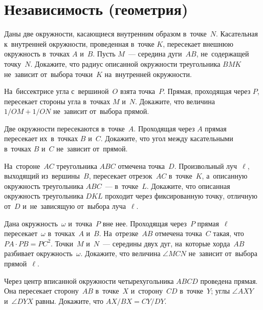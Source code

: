 
\section*{Независимость (геометрия)}


\begin{problems}

\item
Даны две окружности, касающиеся внутренним образом в~точке~$N$.
Касательная к~внутренней окружности, проведенная в~точке $K$, пересекает
внешнюю окружность в~точках $A$ и~$B$.
Пусть $M$~— середина дуги~$AB$, не~содержащей точку~$N$.
Докажите, что радиус описанной окружности треугольника $BMK$ не~зависит
от~выбора точки~$K$ на~внутренней окружности.

\item
На~биссектрисе угла с~вершиной~$O$ взята точка~$P$.
Прямая, проходящая через $P$, пересекает стороны угла в~точках $M$ и~$N$.
Докажите, что величина $1 / OM + 1 / ON$ не~зависит от~выбора прямой.

\item
Две окружности пересекаются в~точке~$A$.
Проходящая через $A$ прямая пересекает их~в~точках $B$ и~$C$.
Докажите, что угол между касательными в~точках $B$ и~$C$ не~зависит от~прямой.

\item
На~стороне~$AC$ треугольника $ABC$ отмечена точка~$D$.
Произвольный луч~$\ell$, выходящий из~вершины~$B$, пересекает отрезок~$AC$
в~точке~$K$, а~описанную окружность треугольника $ABC$~— в~точке~$L$.
Докажите, что описанная окружность треугольника $DKL$ проходит через
фиксированную точку, отличную от~$D$ и~не~зависящую от~выбора луча~$\ell$.

\item
Дана окружность~$\omega$ и~точка~$P$ вне нее.
Проходящая через~$P$ прямая~$\ell$ пересекает~$\omega$ в~точках~$A$ и~$B$.
На~отрезке~$AB$ отмечена точка~$C$ такая, что~$PA\cdot PB=PC^2$.
Точки~$M$ и~$N$~— середины двух дуг, на~которые хорда~$AB$ разбивает
окружность~$\omega$.
Докажите, что величина $\angle MCN$ не~зависит от~выбора прямой~$\ell$.

\item
Через центр вписанной окружности четырехугольника $ABCD$ проведена
прямая.
Она пересекает сторону~$AB$ в~точке~$X$ и~сторону~$CD$ в~точке~$Y$;
углы $\angle AXY$ и~$\angle DYX$ равны.
Докажите, что $AX / BX = CY / DY$.


\end{problems}

